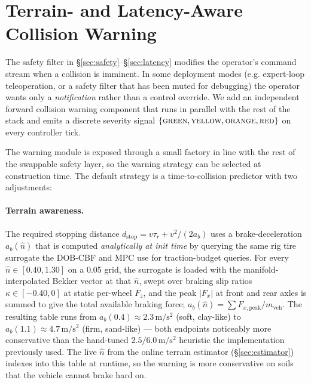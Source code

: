\documentclass[conference,letterpaper,10pt]{IEEEtran}
\begin{document}
\section{Terrain- and Latency-Aware Collision Warning}
\label{sec:collision_warning}

The safety filter in
\S\ref{sec:safety}--\S\ref{sec:latency} modifies the
operator's command stream when a collision is imminent. In some
deployment modes (e.g. expert-loop teleoperation, or a safety filter
that has been muted for debugging) the operator wants only a
\emph{notification} rather than a control override. We add an
independent forward collision warning component that runs in parallel
with the rest of the stack and emits a discrete severity signal
$\{\textsc{green}, \textsc{yellow}, \textsc{orange}, \textsc{red}\}$
on every controller tick.

The warning module is exposed through a small factory in line with
the rest of the swappable safety layer, so the warning strategy can
be selected at construction time. The default strategy is a
time-to-collision predictor with two adjustments:

\paragraph{Terrain awareness.} The required stopping distance
$d_{\mathrm{stop}}=v\tau_{r}+v^{2}/(2a_{b})$ uses a brake-deceleration
$a_{b}(\hat n)$ that is computed \emph{analytically at init time} by
querying the same rig tire surrogate the
DOB-CBF and MPC use for traction-budget queries. For every $\hat n
\in [0.40,1.30]$ on a 0.05 grid, the surrogate is loaded with the
manifold-interpolated Bekker vector at that $\hat n$, swept over
braking slip ratios $\kappa\in[-0.40,0]$ at static per-wheel $F_z$,
and the peak $|F_x|$ at front and rear axles is summed to give the
total available braking force; $a_b(\hat n)=\sum F_{x,\mathrm{peak}}
/ m_{\mathrm{veh}}$. The resulting table runs from
$a_b(0.4)\!\approx\!2.3\,\mathrm{m/s^{2}}$ (soft, clay-like) to
$a_b(1.1)\!\approx\!4.7\,\mathrm{m/s^{2}}$ (firm, sand-like) — both
endpoints noticeably more conservative than the hand-tuned
$2.5/6.0\,\mathrm{m/s^{2}}$ heuristic the implementation previously
used. The live $\hat n$ from the online terrain estimator
(\S\ref{sec:estimator}) indexes into this table at runtime, so the
warning is more conservative on soils that the vehicle cannot brake
hard on.
\end{document}

